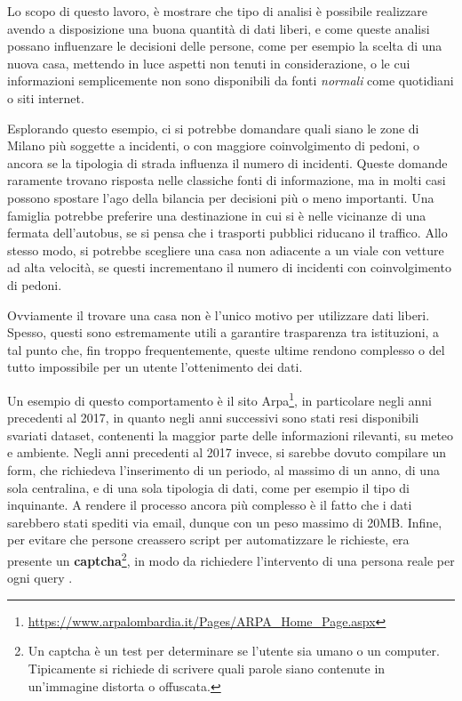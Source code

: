 \documentclass[a4paper,12pt]{report}
\newcommand{\quotestyle}[1]{\textit{#1}}
\begin{document}

Lo scopo di questo lavoro, è mostrare che tipo di analisi è possibile realizzare 
avendo a disposizione una buona quantità di dati liberi, e come queste analisi possano 
influenzare le decisioni delle persone, come per esempio la scelta di una nuova casa, 
mettendo in luce aspetti non tenuti in considerazione, o le cui informazioni semplicemente 
non sono disponibili da fonti \quotestyle{normali} come quotidiani o siti internet.

Esplorando questo esempio, ci si potrebbe domandare quali siano le zone 
di Milano più soggette a incidenti, o con maggiore coinvolgimento di pedoni, 
o ancora se la tipologia di strada influenza il numero di incidenti. 
Queste domande raramente trovano risposta nelle classiche fonti di informazione, 
ma in molti casi possono spostare l'ago della bilancia per decisioni più o meno 
importanti.
Una famiglia potrebbe preferire una destinazione in cui si è nelle vicinanze di 
una fermata dell'autobus, se si pensa che i trasporti pubblici riducano 
il traffico. 
Allo stesso modo, si potrebbe scegliere una casa non adiacente 
a un viale con vetture ad alta velocità, se questi incrementano il numero di 
incidenti con coinvolgimento di pedoni.

Ovviamente il trovare una casa non è l'unico motivo per utilizzare dati liberi. 
Spesso, questi sono estremamente utili a garantire trasparenza tra istituzioni, 
a tal punto che, fin troppo frequentemente, queste ultime rendono complesso o 
del tutto impossibile per un utente l'ottenimento dei dati.

Un esempio di questo comportamento è il sito 
Arpa\footnote{\url{https://www.arpalombardia.it/Pages/ARPA_Home_Page.aspx}}, 
in particolare negli anni precedenti al 2017, in quanto negli anni successivi 
sono stati resi disponibili svariati dataset, contenenti la maggior parte delle 
informazioni rilevanti, su meteo e ambiente.
Negli anni precedenti al 2017 invece, si sarebbe dovuto compilare un form, che 
richiedeva l'inserimento di un periodo, al massimo di un anno, di una sola 
centralina, e di una sola tipologia di dati, come per esempio il tipo di inquinante. 
A rendere il processo ancora più complesso è il fatto che i dati sarebbero stati 
spediti via email, dunque con un peso massimo di 20MB.
Infine, per evitare che persone creassero script per automatizzare le richieste, 
era presente un \textbf{captcha}\footnote{Un captcha è un test per determinare se l'utente 
sia umano o un computer. Tipicamente si richiede di scrivere quali parole siano 
contenute in un'immagine distorta o offuscata.}, in modo da richiedere l'intervento 
di una persona reale per ogni query \cite{TRENTINI:1}.
\end{document}
